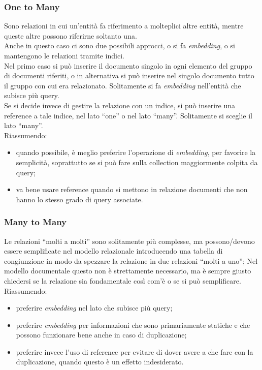 \subsubsection{One to Many}
Sono relazioni in cui un'entità fa riferimento a molteplici altre entità, mentre queste altre possono riferirne soltanto una.\\
Anche in questo caso ci sono due possibili approcci, o si fa \textit{embedding}, o si mantengono le relazioni tramite indici.\\
Nel primo caso si può inserire il documento singolo in ogni elemento del gruppo di documenti riferiti, o in alternativa si può inserire nel singolo documento tutto il gruppo con cui era relazionato. Solitamente si fa \textit{embedding} nell'entità che subisce più query.\\
Se si decide invece di gestire la relazione con un indice, si può inserire una reference a tale indice, nel lato ``one'' o nel lato ``many''. Solitamente si sceglie il lato ``many''.\\
Riassumendo:
\begin{itemize}
    \item quando possibile, è meglio preferire l'operazione di \textit{embedding}, per favorire la semplicità, soprattutto se si può fare sulla collection maggiormente colpita da query;
    \item va bene usare reference quando si mettono in relazione documenti che non hanno lo stesso grado di query associate.
\end{itemize}

\subsubsection{Many to Many}
Le relazioni ``molti a molti'' sono solitamente più complesse, ma possono/devono essere semplificate nel modello relazionale introducendo una tabella di congiunzione in modo da spezzare la relazione in due relazioni ``molti a uno'';
Nel modello documentale questo non è strettamente necessario, ma è sempre giusto chiedersi se la relazione sia fondamentale così com'è o se si può semplificare.
Riassumendo:
\begin{itemize}
    \item preferire \textit{embedding} nel lato che subisce più query;
    \item preferire \textit{embedding} per informazioni che sono primariamente statiche e che possono funzionare bene anche in caso di duplicazione;
    \item preferire invece l'uso di reference per evitare di dover avere a che fare con la duplicazione, quando questo è un effetto indesiderato.
\end{itemize}

